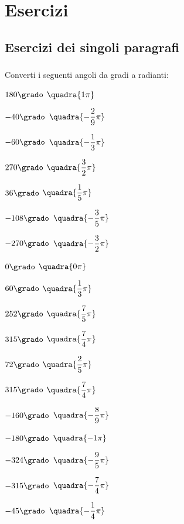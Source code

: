 
\section{Esercizi}

\subsection{Esercizi dei singoli paragrafi}

\subsubsection*{}

\begin{esercizio}\label{ese:gonio.1}
 Converti i seguenti angoli da gradi a radianti:
\begin{multicols}{3}
 \begin{enumeratea}
  \item  $180\grado$
   \hfill $\quadra{1\pi}$
  \item  $-40\grado$
   \hfill $\quadra{-\dfrac{2}{9}\pi}$
  \item  $-60\grado$
   \hfill $\quadra{-\dfrac{1}{3}\pi}$
  \item  $270\grado$
   \hfill $\quadra{\dfrac{3}{2}\pi}$
  \item  $36\grado$
   \hfill $\quadra{\dfrac{1}{5}\pi}$
  \item  $-108\grado$
   \hfill $\quadra{-\dfrac{3}{5}\pi}$
  \item  $-270\grado$
   \hfill $\quadra{-\dfrac{3}{2}\pi}$
  \item  $0\grado$
   \hfill $\quadra{0\pi}$
  \item  $60\grado$
   \hfill $\quadra{\dfrac{1}{3}\pi}$
  \item  $252\grado$
   \hfill $\quadra{\dfrac{7}{5}\pi}$
  \item  $315\grado$
   \hfill $\quadra{\dfrac{7}{4}\pi}$
  \item  $72\grado$
   \hfill $\quadra{\dfrac{2}{5}\pi}$
  \item  $315\grado$
   \hfill $\quadra{\dfrac{7}{4}\pi}$
  \item  $-160\grado$
   \hfill $\quadra{-\dfrac{8}{9}\pi}$
  \item  $-180\grado$
   \hfill $\quadra{-1\pi}$
  \item  $-324\grado$
   \hfill $\quadra{-\dfrac{9}{5}\pi}$
  \item  $-315\grado$
   \hfill $\quadra{-\dfrac{7}{4}\pi}$
  \item  $-45\grado$
   \hfill $\quadra{-\dfrac{1}{4}\pi}$
 \end{enumeratea}
\end{multicols}
\end{esercizio}

